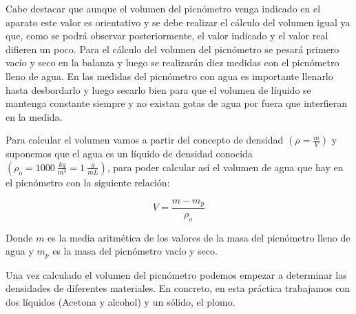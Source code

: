 \documentclass[a4paper,12pt,titlepage]{article}
\begin{document}
Cabe destacar que aunque el volumen del picnómetro venga indicado en el aparato este valor es orientativo y se debe realizar el cálculo del volumen igual ya que, como se podrá observar posteriormente, el valor indicado y el valor real difieren un poco. Para el cálculo del volumen del picnómetro se pesará primero vacío y seco en la balanza y luego se realizarán diez medidas con el picnómetro lleno de agua. En las medidas del picnómetro con agua es importante llenarlo hasta desbordarlo y luego secarlo bien para que el volumen de líquido se mantenga constante siempre y no existan gotas de agua por fuera que interfieran en la medida.

\par Para calcular el volumen vamos a partir del concepto de densidad $(\rho = \frac{m}{V})$ y suponemos que el agua es un líquido de densidad conocida $(\rho_{o} = 1000 \: \frac{kg}{m^3}=1 \: \frac{g}{mL})$, para poder calcular así el volumen de agua que hay en el picnómetro con la siguiente relación:

\begin{equation}
    V = \frac{m-m_{p}}{\rho_{o}}
    \label{VolPicnometro}
\end{equation}

Donde $m$ es la media aritmética de los valores de la masa del picnómetro lleno de agua y $m_{p}$ es la masa del picnómetro vacío y seco.

\par Una vez calculado el volumen del picnómetro podemos empezar a determinar las densidades de diferentes materiales. En concreto, en esta práctica trabajamos con dos líquidos (Acetona y alcohol) y un sólido, el plomo.
\end{document}
